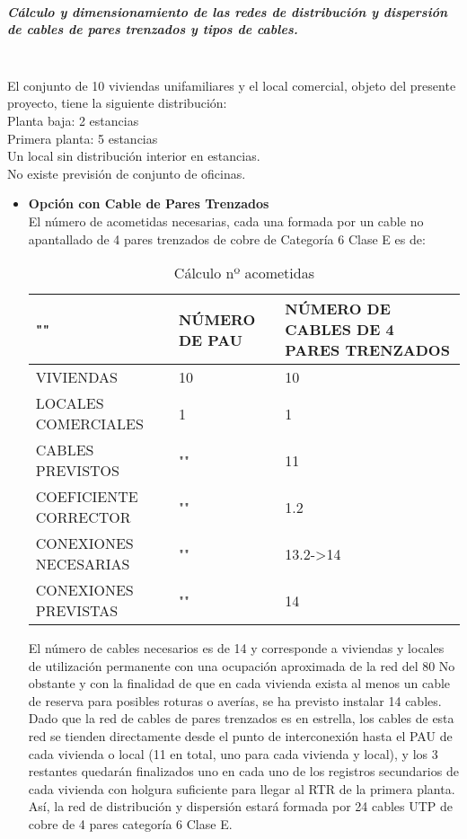 \subparagraph{Cálculo y dimensionamiento de las redes de distribución y dispersión de cables de pares trenzados y tipos de cables.}\textbf{}\\
El conjunto de 10 viviendas unifamiliares y el local comercial, objeto del presente
proyecto, tiene la siguiente distribución:\\
Planta baja:		2 estancias\\
Primera planta: 	5 estancias\\
Un local sin distribución interior en estancias.\\
No existe previsión de conjunto de oficinas.
\begin{itemize}
	\item \textbf{Opción con Cable de Pares Trenzados}\\
	El número de acometidas necesarias, cada una formada por un cable no apantallado de 4 pares trenzados de cobre de Categoría 6 Clase E es de:\\
	\begin{table}[H]
\centering
\begin{tabular}{|p{5cm}| p{5cm}| p{5cm}|}
\hline
""&NÚMERO DE PAU&NÚMERO DE CABLES DE 4 PARES TRENZADOS \\
\hline \hline
VIVIENDAS&10&10\\
\hline
LOCALES COMERCIALES&1&1\\
\hline
CABLES PREVISTOS&""&11\\
\hline
COEFICIENTE CORRECTOR&""&1.2\\
\hline
CONEXIONES NECESARIAS&""&13.2->14\\
\hline
CONEXIONES PREVISTAS&""&14\\
\hline
\end{tabular}

\caption{Cálculo nº acometidas}
\label{tabla:autores}
\end{table}

El número de cables necesarios es de 14 y corresponde a viviendas y locales de utilización permanente con una ocupación aproximada de la red del 80%
No obstante y con la finalidad de que en cada vivienda exista al menos un cable de reserva para
posibles roturas o averías, se ha previsto instalar 14 cables.\\
Dado que la red de cables de pares trenzados es en estrella, los cables de esta red se tienden
directamente desde el punto de interconexión hasta el PAU de cada vivienda o local (11 en total,
uno para cada vivienda y local), y los 3 restantes quedarán finalizados uno en cada uno de los
registros secundarios de cada vivienda con holgura suficiente para llegar al RTR de la primera planta.\\
Así, la red de distribución y dispersión estará formada por 24 cables UTP de cobre de 4 pares categoría 6 Clase E.

\end{itemize}

